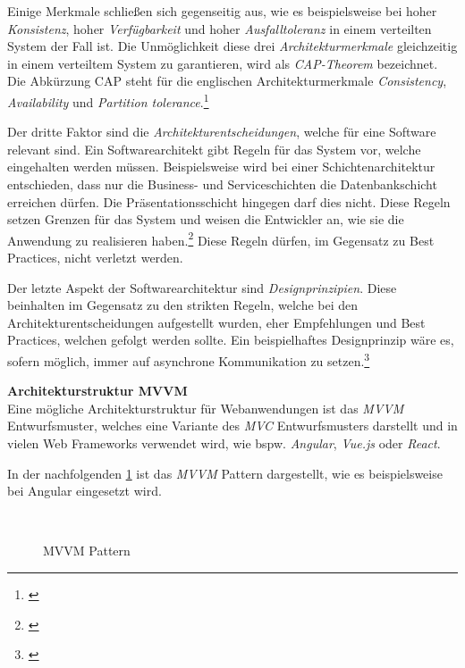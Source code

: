 Einige Merkmale schließen sich gegenseitig aus, wie es beispielsweise bei hoher \textit{Konsistenz}, hoher \textit{Verfügbarkeit} und hoher \textit{Ausfalltoleranz} in einem verteilten System der Fall ist. Die Unmöglichkeit diese drei \textit{Architekturmerkmale} gleichzeitig in einem verteiltem System zu garantieren, wird als \textit{CAP-Theorem} bezeichnet. Die Abkürzung CAP steht für die englischen Architekturmerkmale \textit{Consistency}, \textit{Availability} und \textit{Partition tolerance}.\footnote{\cite[vgl.][]{IBM2019}}

Der dritte Faktor sind die \textit{Architekturentscheidungen}, welche für eine Software relevant sind. Ein Softwarearchitekt gibt Regeln für das System vor, welche eingehalten werden müssen. Beispielsweise wird bei einer Schichtenarchitektur entschieden, dass nur die Business- und Serviceschichten die Datenbankschicht erreichen dürfen. Die Präsentationsschicht hingegen darf dies nicht. Diese Regeln setzen Grenzen für das System und weisen die Entwickler an, wie sie die Anwendung zu realisieren haben.\footnote{\cite[vgl.][17]{Ford2020}} Diese Regeln dürfen, im Gegensatz zu Best Practices, nicht verletzt werden.

Der letzte Aspekt der Softwarearchitektur sind \textit{Designprinzipien}. Diese beinhalten im Gegensatz zu den strikten Regeln, welche bei den Architekturentscheidungen aufgestellt wurden, eher Empfehlungen und Best Practices, welchen gefolgt werden sollte. Ein beispielhaftes Designprinzip wäre es, sofern möglich, immer auf asynchrone Kommunikation zu setzen.\footnote{\cite[vgl.][18\psq]{Ford2020}}

\textbf{Architekturstruktur MVVM}\\
Eine mögliche Architekturstruktur für Webanwendungen ist das \textit{\gls{MVVM}} Entwurfsmuster, welches eine Variante des \textit{\gls{MVC}} Entwurfsmusters darstellt und in vielen Web Frameworks verwendet wird, wie bspw. \textit{Angular}, \textit{Vue.js} oder \textit{React}.

In der nachfolgenden \cref{fig:MVVM} ist das \textit{\gls{MVVM}} Pattern dargestellt, wie es beispielsweise bei Angular eingesetzt wird.

\begin{figure}[hbt!]
	\begin{minipage}[t]{1\textwidth}	
		\caption{MVVM Pattern}
		\\ %
		\label{fig:MVVM}
	\end{minipage}
\end{figure}

